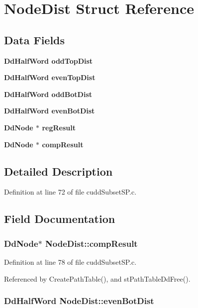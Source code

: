 \section{Node\-Dist Struct Reference}
\label{structNodeDist}
\subsection*{Data Fields}
\begin{CompactItemize}
\item 
\bf{Dd\-Half\-Word} \bf{odd\-Top\-Dist}
\item 
\bf{Dd\-Half\-Word} \bf{even\-Top\-Dist}
\item 
\bf{Dd\-Half\-Word} \bf{odd\-Bot\-Dist}
\item 
\bf{Dd\-Half\-Word} \bf{even\-Bot\-Dist}
\item 
\bf{Dd\-Node} $\ast$ \bf{reg\-Result}
\item 
\bf{Dd\-Node} $\ast$ \bf{comp\-Result}
\end{CompactItemize}


\subsection{Detailed Description}




Definition at line 72 of file cudd\-Subset\-SP.c.

\subsection{Field Documentation}
\subsubsection{\setlength{\rightskip}{0pt plus 5cm}\bf{Dd\-Node}$\ast$ \bf{Node\-Dist::comp\-Result}}\label{structNodeDist_ff2192cf88ea8db6bfdbd964b1dc35cc}




Definition at line 78 of file cudd\-Subset\-SP.c.

Referenced by Create\-Path\-Table(), and st\-Path\-Table\-Dd\-Free().
\subsubsection{\setlength{\rightskip}{0pt plus 5cm}\bf{Dd\-Half\-Word} \bf{Node\-Dist::even\-Bot\-Dist}}\label{structNodeDist_8eebe734f7206e38fe544f60502a0798}




